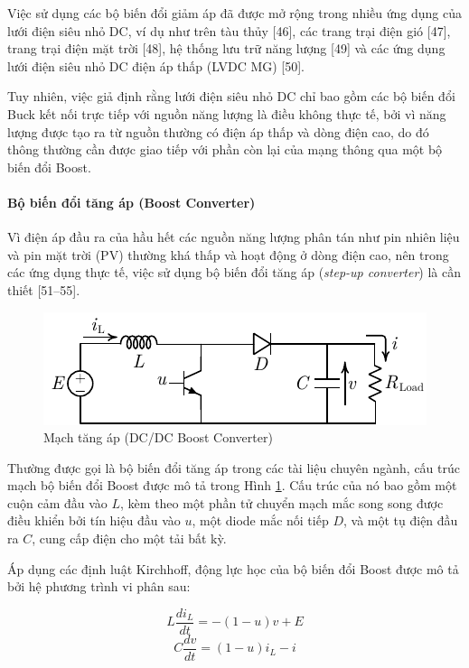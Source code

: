 Việc sử dụng các bộ biến đổi giảm áp đã được mở rộng trong nhiều ứng dụng của lưới điện siêu nhỏ DC, ví dụ như trên tàu thủy [46], các trang trại điện gió [47], trang trại điện mặt trời [48], hệ thống lưu trữ năng lượng [49] và các ứng dụng lưới điện siêu nhỏ DC điện áp thấp (LVDC MG) [50]. \par
Tuy nhiên, việc giả định rằng lưới điện siêu nhỏ DC chỉ bao gồm các bộ biến đổi Buck kết nối trực tiếp với nguồn năng lượng là điều không thực tế, bởi vì năng lượng được tạo ra từ nguồn thường có điện áp thấp và dòng điện cao, do đó thông thường cần được giao tiếp với phần còn lại của mạng thông qua một bộ biến đổi Boost. \par
\paragraph{Bộ biến đổi tăng áp (Boost Converter)}
Vì điện áp đầu ra của hầu hết các nguồn năng lượng phân tán như pin nhiên liệu và pin mặt trời (PV) thường khá thấp và hoạt động ở dòng điện cao, nên trong các ứng dụng thực tế, việc sử dụng bộ biến đổi tăng áp (\textit{step-up converter}) là cần thiết [51–55]. \par
\begin{figure}[!b]
    \centering
    \includegraphics[width= 0.7 \textwidth]{Figures/Content_Pages/Chapter_2/C2_2.pdf}
    \caption{Mạch tăng áp (DC/DC Boost Converter)}
    \label{fig:C2_2}
\end{figure}
Thường được gọi là bộ biến đổi tăng áp trong các tài liệu chuyên ngành, cấu trúc mạch bộ biến đổi Boost được mô tả trong Hình \ref{fig:C2_2}. Cấu trúc của nó bao gồm một cuộn cảm đầu vào \( L \), kèm theo một phần tử chuyển mạch mắc song song được điều khiển bởi tín hiệu đầu vào \( u \), một diode mắc nối tiếp \( D \), và một tụ điện đầu ra \( C \), cung cấp điện cho một tải bất kỳ. \par
Áp dụng các định luật Kirchhoff, động lực học của bộ biến đổi Boost được mô tả bởi hệ phương trình vi phân sau: \par
\begin{equation} \label{E2_3}
    L\frac{di_L}{dt} = -(1-u)v +E
\end{equation}
\begin{equation} \label{E2_4}
    C \frac{dv}{dt} = (1-u)i_L - i
\end{equation}
